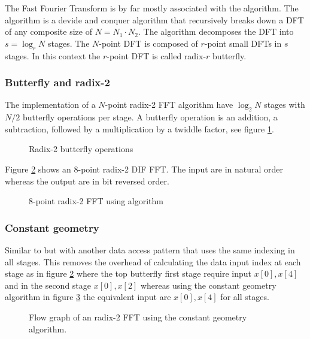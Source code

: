 The Fast Fourier Transform is by far mostly associated with the {\CTALG} algorithm\cite{cooley1965algorithm}. The {\CTALG} algorithm is a devide and conquer algorithm that recursively breaks down a \gls{DFT} of any composite size of $N = N_1{\cdot}N_2$. The algorithm decomposes the \gls{DFT} into $s = \log_r{N}$ stages. The $N$-point \gls{DFT} is composed of $r$-point small \gls{DFT}s in $s$ stages. In this context the $r$-point \gls{DFT} is called radix-$r$ butterfly.

\subsubsection{Butterfly and radix-2}

The implementation of a $N$-point radix-2 \gls{FFT} algorithm have $\log_2{N}$ stages with $N/2$ butterfly operations per stage. A butterfly operation is an addition, a subtraction, followed by a multiplication by a twiddle factor, see figure \ref{fig:butterfly}.

\begin{figure}
	\centering
	
	\caption{Radix-2 butterfly operations}
	\label{fig:butterfly}
\end{figure}

Figure \ref{fig:cooley-tukey-8} shows an 8-point radix-2 \gls{DIF} \gls{FFT}. The input are in natural order whereas the output are in bit reversed order.

\begin{figure}
	\centering
	
	\caption{8-point radix-2 \gls{FFT} using {\CTALG} algorithm}
	\label{fig:cooley-tukey-8}
\end{figure}

\subsubsection{Constant geometry}

Similar to {\CTALG} but with another data access pattern that uses the same indexing in all stages. This removes the overhead of calculating the data input index at each stage as in figure \ref{fig:cooley-tukey-8} where the top butterfly first stage require input $x[0], x[4]$ and in the second stage $x[0], x[2]$ whereas using the constant geometry algorithm in figure \ref{fig:constant-geometry-8} the equivalent input are $x[0], x[4]$ for all stages.

\begin{figure}
	\centering
	
	\caption{Flow graph of an radix-2 \gls{FFT} using the constant geometry algorithm.}
	\label{fig:constant-geometry-8}
\end{figure}

